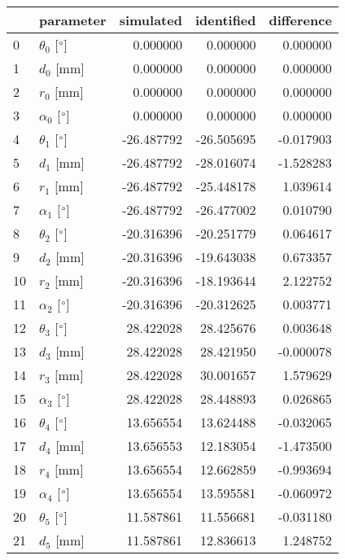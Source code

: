 \documentclass{standalone}%
\begin{document}
%
\normalsize%
\begin{tabular}{llrrr}
\toprule
{} &                 parameter &  simulated & identified & difference \\
\midrule
0  &  $\theta_{0}$ [$\degree$] &   0.000000 &   0.000000 &   0.000000 \\
1  &              $d_{0}$ [mm] &   0.000000 &   0.000000 &   0.000000 \\
2  &              $r_{0}$ [mm] &   0.000000 &   0.000000 &   0.000000 \\
3  &  $\alpha_{0}$ [$\degree$] &   0.000000 &   0.000000 &   0.000000 \\
4  &  $\theta_{1}$ [$\degree$] & -26.487792 & -26.505695 &  -0.017903 \\
5  &              $d_{1}$ [mm] & -26.487792 & -28.016074 &  -1.528283 \\
6  &              $r_{1}$ [mm] & -26.487792 & -25.448178 &   1.039614 \\
7  &  $\alpha_{1}$ [$\degree$] & -26.487792 & -26.477002 &   0.010790 \\
8  &  $\theta_{2}$ [$\degree$] & -20.316396 & -20.251779 &   0.064617 \\
9  &              $d_{2}$ [mm] & -20.316396 & -19.643038 &   0.673357 \\
10 &              $r_{2}$ [mm] & -20.316396 & -18.193644 &   2.122752 \\
11 &  $\alpha_{2}$ [$\degree$] & -20.316396 & -20.312625 &   0.003771 \\
12 &  $\theta_{3}$ [$\degree$] &  28.422028 &  28.425676 &   0.003648 \\
13 &              $d_{3}$ [mm] &  28.422028 &  28.421950 &  -0.000078 \\
14 &              $r_{3}$ [mm] &  28.422028 &  30.001657 &   1.579629 \\
15 &  $\alpha_{3}$ [$\degree$] &  28.422028 &  28.448893 &   0.026865 \\
16 &  $\theta_{4}$ [$\degree$] &  13.656554 &  13.624488 &  -0.032065 \\
17 &              $d_{4}$ [mm] &  13.656553 &  12.183054 &  -1.473500 \\
18 &              $r_{4}$ [mm] &  13.656554 &  12.662859 &  -0.993694 \\
19 &  $\alpha_{4}$ [$\degree$] &  13.656554 &  13.595581 &  -0.060972 \\
20 &  $\theta_{5}$ [$\degree$] &  11.587861 &  11.556681 &  -0.031180 \\
21 &              $d_{5}$ [mm] &  11.587861 &  12.836613 &   1.248752 \\

\end{tabular}
\end{document}
